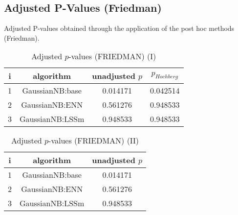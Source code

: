 \documentclass[a4paper,10pt]{article}
\begin{document}
\begin{landscape}
\newpage

\section{Adjusted P-Values (Friedman)}


Adjusted P-values obtained through the application of the post hoc methods (Friedman).

\begin{table}[!htp]
\centering\small
\begin{tabular}{cccc}
i&algorithm&unadjusted $p$&$p_{Hochberg}$\\
\hline1&GaussianNB:base&0.014171&0.042514\\2&GaussianNB:ENN&0.561276&0.948533\\3&GaussianNB:LSSm&0.948533&0.948533\\\hline
\end{tabular}
\caption{Adjusted $p$-values (FRIEDMAN) (I)}
\end{table}
\begin{table}[!htp]
\centering\small
\begin{tabular}{ccc}
i&algorithm&unadjusted $p$\\
\hline1&GaussianNB:base&0.014171\\2&GaussianNB:ENN&0.561276\\3&GaussianNB:LSSm&0.948533\\\hline
\end{tabular}
\caption{Adjusted $p$-values (FRIEDMAN) (II)}
\end{table}

\newpage
\end{landscape}
\end{document}

